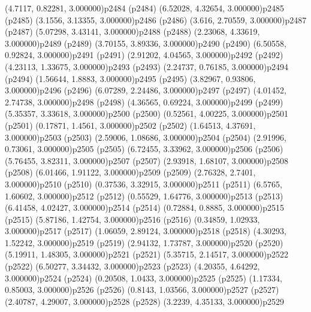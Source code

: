 \psPoint(4.7117, 0.82281, 3.000000){p2484}
\psdot(p2484)
\psPoint(6.52028, 4.32654, 3.000000){p2485}
\psdot(p2485)
\psPoint(3.1556, 3.13355, 3.000000){p2486}
\psdot(p2486)
\psPoint(3.616, 2.70559, 3.000000){p2487}
\psdot(p2487)
\psPoint(5.07298, 3.43141, 3.000000){p2488}
\psdot(p2488)
\psPoint(2.23068, 4.33619, 3.000000){p2489}
\psdot(p2489)
\psPoint(3.70155, 3.89336, 3.000000){p2490}
\psdot(p2490)
\psPoint(6.50558, 0.92824, 3.000000){p2491}
\psdot(p2491)
\psPoint(2.91202, 4.04565, 3.000000){p2492}
\psdot(p2492)
\psPoint(4.23113, 1.33675, 3.000000){p2493}
\psdot(p2493)
\psPoint(2.24737, 0.76185, 3.000000){p2494}
\psdot(p2494)
\psPoint(1.56644, 1.8883, 3.000000){p2495}
\psdot(p2495)
\psPoint(3.82967, 0.93806, 3.000000){p2496}
\psdot(p2496)
\psPoint(6.07289, 2.24486, 3.000000){p2497}
\psdot(p2497)
\psPoint(4.01452, 2.74738, 3.000000){p2498}
\psdot(p2498)
\psPoint(4.36565, 0.69224, 3.000000){p2499}
\psdot(p2499)
\psPoint(5.35357, 3.33618, 3.000000){p2500}
\psdot(p2500)
\psPoint(0.52561, 4.00225, 3.000000){p2501}
\psdot(p2501)
\psPoint(0.17871, 1.4561, 3.000000){p2502}
\psdot(p2502)
\psPoint(1.64513, 4.37691, 3.000000){p2503}
\psdot(p2503)
\psPoint(2.59006, 1.08686, 3.000000){p2504}
\psdot(p2504)
\psPoint(2.91996, 0.73061, 3.000000){p2505}
\psdot(p2505)
\psPoint(6.72455, 3.33962, 3.000000){p2506}
\psdot(p2506)
\psPoint(5.76455, 3.82311, 3.000000){p2507}
\psdot(p2507)
\psPoint(2.93918, 1.68107, 3.000000){p2508}
\psdot(p2508)
\psPoint(6.01466, 1.91122, 3.000000){p2509}
\psdot(p2509)
\psPoint(2.76328, 2.7401, 3.000000){p2510}
\psdot(p2510)
\psPoint(0.37536, 3.32915, 3.000000){p2511}
\psdot(p2511)
\psPoint(6.5765, 1.60602, 3.000000){p2512}
\psdot(p2512)
\psPoint(0.55529, 1.64776, 3.000000){p2513}
\psdot(p2513)
\psPoint(6.41458, 4.02427, 3.000000){p2514}
\psdot(p2514)
\psPoint(0.72884, 0.8885, 3.000000){p2515}
\psdot(p2515)
\psPoint(5.87186, 1.42754, 3.000000){p2516}
\psdot(p2516)
\psPoint(0.34859, 1.02933, 3.000000){p2517}
\psdot(p2517)
\psPoint(1.06059, 2.89124, 3.000000){p2518}
\psdot(p2518)
\psPoint(4.30293, 1.52242, 3.000000){p2519}
\psdot(p2519)
\psPoint(2.94132, 1.73787, 3.000000){p2520}
\psdot(p2520)
\psPoint(5.19911, 1.48305, 3.000000){p2521}
\psdot(p2521)
\psPoint(5.35715, 2.14517, 3.000000){p2522}
\psdot(p2522)
\psPoint(6.50277, 3.34432, 3.000000){p2523}
\psdot(p2523)
\psPoint(4.20355, 4.64292, 3.000000){p2524}
\psdot(p2524)
\psPoint(0.20508, 1.0433, 3.000000){p2525}
\psdot(p2525)
\psPoint(1.17334, 0.85003, 3.000000){p2526}
\psdot(p2526)
\psPoint(0.8143, 1.03566, 3.000000){p2527}
\psdot(p2527)
\psPoint(2.40787, 4.29007, 3.000000){p2528}
\psdot(p2528)
\psPoint(3.2239, 4.35133, 3.000000){p2529}
